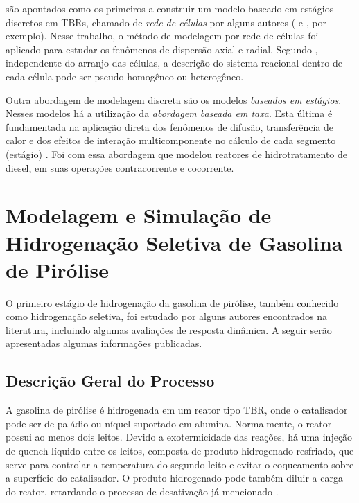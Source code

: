  são apontados como os primeiros a construir um modelo
baseado em estágios discretos em TBRs, chamado de \emph{rede de células} por
alguns autores ( e , por
exemplo). Nesse trabalho, o método de modelagem por rede de células foi aplicado
para estudar os fenômenos de dispersão axial e radial. Segundo
, independente do arranjo das células, a descrição
do sistema reacional dentro de cada célula pode ser pseudo-homogêneo ou
heterogêneo.

Outra abordagem de modelagem discreta são os modelos \emph{baseados em
estágios}. Nesses modelos há a utilização da \emph{abordagem baseada em taxa}.
Esta última é fundamentada na aplicação direta dos fenômenos de difusão,
transferência de calor e dos efeitos de interação multicomponente no cálculo de
cada segmento (estágio) \cite{Jakobsson2004}. Foi com essa abordagem que
 modelou reatores de hidrotratamento de diesel, em
suas operações contracorrente e cocorrente.

\section {Modelagem e Simulação de Hidrogenação Seletiva de Gasolina de Pirólise}
\label{sec:hidrogenacaopygas}

O primeiro estágio de hidrogenação da gasolina de pirólise, também conhecido
como hidrogenação seletiva, foi estudado por alguns autores encontrados na
literatura, incluindo algumas avaliações de resposta dinâmica. A seguir serão
apresentadas algumas informações publicadas.

\subsection{Descrição Geral do Processo} \label{sec:descricaogeral}

A gasolina de pirólise é hidrogenada em um reator tipo TBR, onde o catalisador
pode ser de paládio ou níquel suportado em alumina. Normalmente, o reator possui
ao menos dois leitos. Devido a exotermicidade das reações, há uma injeção de
quench líquido entre os leitos, composta de produto hidrogenado resfriado, que
serve para controlar a temperatura do segundo leito e evitar o coqueamento sobre
a superfície do catalisador. O produto hidrogenado pode também diluir a carga do
reator, retardando o processo de desativação já mencionado
\cite{Cheng1986,Derrien1986,Arpornwichanop2002,Rojas2014a}.


